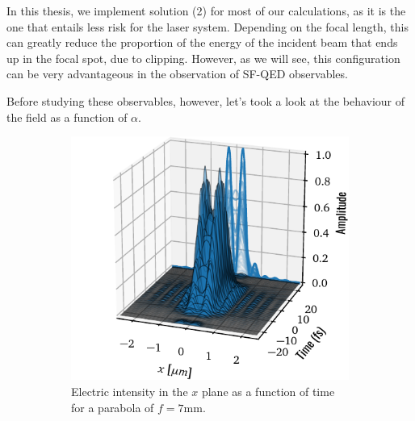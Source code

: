 \documentclass[11pt,SymmetricalJury]{inrsthesis/inrsthesis}
\begin{document}
In this thesis, we implement solution (2) for most of our calculations, as
it is the one that entails less risk for the laser system. Depending on the focal
length, this can greatly reduce the proportion of the energy of the incident
beam that ends up in the focal spot, due to clipping. However, as we will
see, this configuration can be very advantageous in the observation of SF-QED
observables.

Before studying these observables, however, let's took a look at the behaviour
of the field as a function of $\alpha$.


  \begin{figure}
    \begin{subfigure}{0.47\textwidth}
      \centering
      \includegraphics[width=\textwidth]{figs/ElectricIntensityTimeWaterfallf0.007.pdf}
      \caption{Electric intensity in the $x$ plane as a function of time for a parabola of $f=7\si{\milli\metre}$.}
      \label{fig:sc.electric_intensity_waterfall7}
    \end{subfigure}
    \hfill
    \begin{subfigure}{0.47\textwidth}
      \centering

\end{subfigure}
\end{figure}
\end{document}
